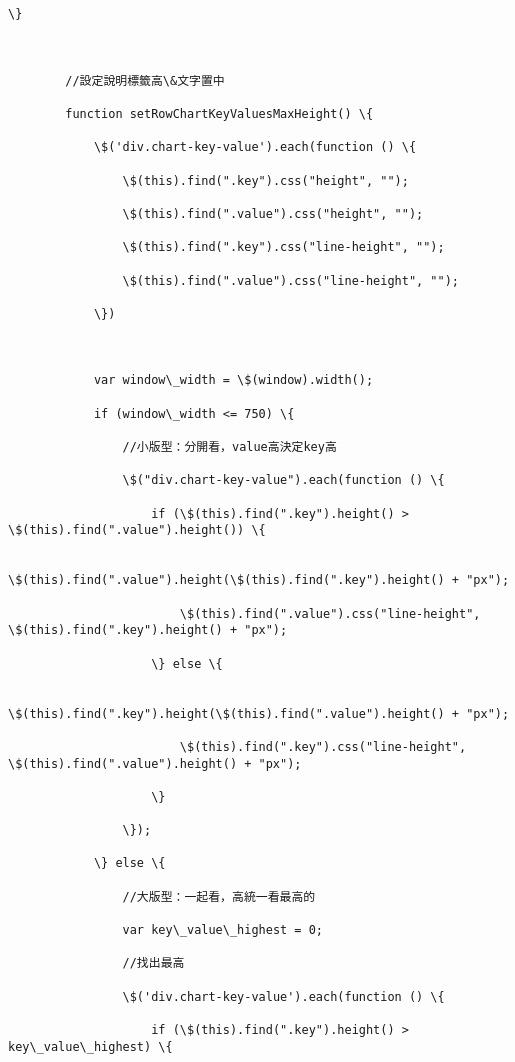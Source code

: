 \documentclass[11pt]{article}
\begin{document}
\begin{Verbatim}[commandchars=\\\{\}]
        \}



        //設定說明標籤高\&文字置中

        function setRowChartKeyValuesMaxHeight() \{

            \$('div.chart-key-value').each(function () \{

                \$(this).find(".key").css("height", "");

                \$(this).find(".value").css("height", "");

                \$(this).find(".key").css("line-height", "");

                \$(this).find(".value").css("line-height", "");

            \})



            var window\_width = \$(window).width();

            if (window\_width <= 750) \{

                //小版型：分開看，value高決定key高

                \$("div.chart-key-value").each(function () \{

                    if (\$(this).find(".key").height() > \$(this).find(".value").height()) \{

                        \$(this).find(".value").height(\$(this).find(".key").height() + "px");

                        \$(this).find(".value").css("line-height", \$(this).find(".key").height() + "px");

                    \} else \{

                        \$(this).find(".key").height(\$(this).find(".value").height() + "px");

                        \$(this).find(".key").css("line-height", \$(this).find(".value").height() + "px");

                    \}

                \});

            \} else \{

                //大版型：一起看，高統一看最高的

                var key\_value\_highest = 0;

                //找出最高

                \$('div.chart-key-value').each(function () \{

                    if (\$(this).find(".key").height() > key\_value\_highest) \{


\end{Verbatim}
\end{document}
